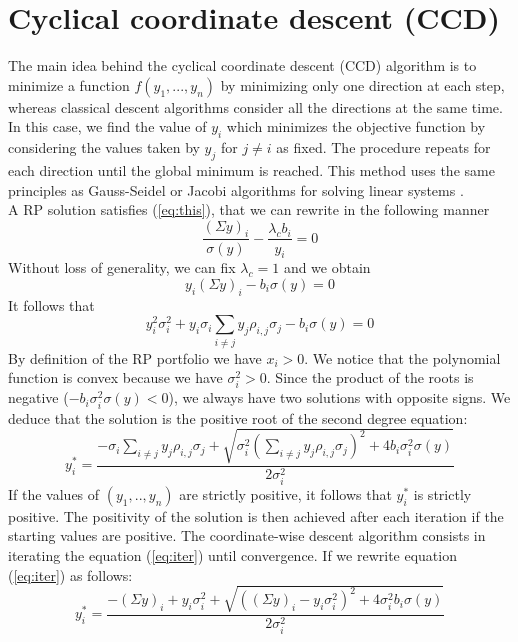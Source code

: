 \section{Cyclical coordinate descent (CCD)}The main idea behind the cyclical coordinate descent (CCD) algorithm is to minimize a function $f(y_1,...,y_n)$ by minimizing only one direction at each step, whereas classical descent algorithms consider all the directions at the same time. In this case, we find the value of $y_i$ which minimizes the objective function by considering the values taken by $y_j$ for $j \neq i$ as fixed. The procedure repeats for each direction until the global minimum is reached. This method uses the same principles as Gauss-Seidel or Jacobi algorithms for solving linear systems  \cite{ccd}.\\
A RP solution satisfies (\ref{eq:this}), that we can rewrite in the following manner
\begin{equation}
\frac{(\Sigma y)_i}{\sigma(y)} - \frac{\lambda_c b_i}{y_i} = 0
\end{equation}
Without loss of generality, we can fix $\lambda_c = 1$ and we obtain
\begin{equation}
y_i(\Sigma y)_i - b_i\sigma(y) = 0
\end{equation}
It follows that
\begin{equation}
y_i^2\sigma_i^2 + y_i\sigma_i\sum_{i \neq j} y_j \rho_{i,j} \sigma_j - b_i\sigma(y) = 0
\end{equation}
By definition of the RP portfolio we have $x_i > 0$. We notice that the polynomial function is convex because we have $\sigma_i^2 > 0$. Since the product of the roots is negative ($-b_i\sigma_i^2\sigma(y)<0$), we always have two solutions with opposite signs. We deduce that the solution is the positive root of the second degree equation:
\begin{equation}\label{eq:iter}
y_i^* = \frac{-\sigma_i\sum_{i \neq j} y_j \rho_{i,j} \sigma_j + \sqrt{\sigma_i^2(\sum_{i \neq j} y_j \rho_{i,j} \sigma_j)^2 + 4b_i\sigma_i^2\sigma(y)}}{2\sigma_i^2}
\end{equation}
If the values of $(y_1,.., y_n)$ are strictly positive, it follows that $y_i^*$ is strictly positive. The positivity of the solution is then achieved after each iteration if the starting values are positive. The coordinate-wise descent algorithm consists in iterating the equation (\ref{eq:iter}) until convergence. If we rewrite equation (\ref{eq:iter}) as follows:
\begin{equation}
y_i^* = \frac{-(\Sigma y)_i + y_i\sigma_i^2 + \sqrt{((\Sigma y)_i - y_i \sigma_i^2)^2 + 4\sigma_i^2b_i\sigma(y)}}{2\sigma_i^2}
\end{equation}
